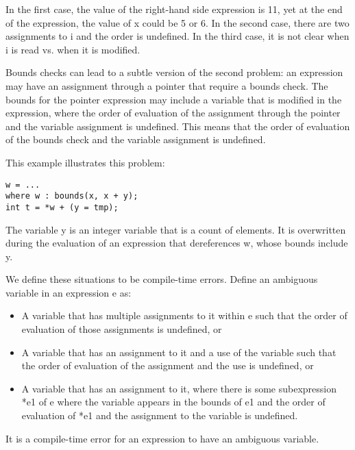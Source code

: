 In the first case, the value of the right-hand side expression is 11,
yet at the end of the expression, the value of x could be 5 or 6. In the
second case, there are two assignments to i and the order is undefined.
In the third case, it is not clear when i is read vs. when it is
modified.

Bounds checks can lead to a subtle version of the second problem: an
expression may have an assignment through a pointer that require a
bounds check. The bounds for the pointer expression may include a
variable that is modified in the expression, where the order of
evaluation of the assignment through the pointer and the variable
assignment is undefined. This means that the order of evaluation of the
bounds check and the variable assignment is undefined.

This example illustrates this problem:

\begin{lstlisting}
w = ...
where w : bounds(x, x + y);
int t = *w + (y = tmp);
\end{lstlisting}

The variable y is an integer variable that is a count of elements. It is
overwritten during the evaluation of an expression that dereferences w,
whose bounds include y.

We define these situations to be compile-time errors. Define an
ambiguous variable in an expression e as:

\begin{itemize}
\item
  A variable that has multiple assignments to it within e such that the
  order of evaluation of those assignments is undefined, or
\item
  A variable that has an assignment to it and a use of the variable such
  that the order of evaluation of the assignment and the use is
  undefined, or
\item
  A variable that has an assignment to it, where there is some
  subexpression *e1 of e where the variable appears in the bounds of e1
  and the order of evaluation of *e1 and the assignment to the variable
  is undefined.
\end{itemize}
It is a compile-time error for an expression to have an ambiguous
variable.
